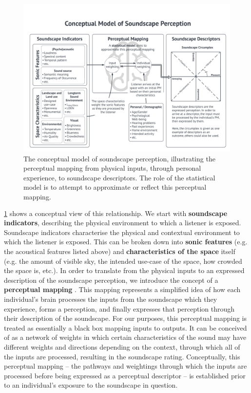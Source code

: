 \begin{figure}[h]
  \includegraphics[width=\textwidth]{Figures/Overall Model Concept Diagram_2022-04-28.png}
  \caption{The conceptual model of soundscape perception, illustrating the perceptual mapping from physical inputs, through personal experience, to soundscape descriptors. The role of the statistical model is to attempt to approximate or reflect this perceptual mapping. \label{fig:percepMap}}
\end{figure}

\cref{fig:percepMap} shows a conceptual view of this relationship. We start with \textbf{soundscape indicators}, describing the physical environment to which a listener is exposed. Soundscape indicators characterise the physical and contextual environment to which the listener is exposed. This can be broken down into \textbf{sonic features} (e.g. the acoustical features listed above) and \textbf{characteristics of the space} itself (e.g. the amount of visible sky, the intended use-case of the space, how crowded the space is, etc.). In order to translate from the physical inputs to an expressed description of the soundscape perception, we introduce the concept of a \textbf{perceptual mapping} \citep{Lionello2021Thesis}. This mapping represents a simplified idea of how each individual's brain processes the inputs from the soundscape which they experience, forms a perception, and finally expresses that perception through their description of the soundscape. For our purposes, this perceptual mapping is treated as essentially a black box mapping inputs to outputs. It can be conceived of as a network of weights in which certain characteristics of the sound may have different weights and directions depending on the context, through which all of the inputs are processed, resulting in the soundscape rating. Conceptually, this perceptual mapping -- the pathways and weightings through which the inputs are processed before being expressed as a perceptual descriptor -- is established prior to an individual's exposure to the soundscape in question.

